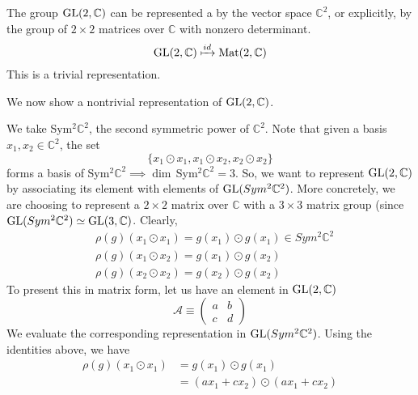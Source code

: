   \begin{example}
    The group $\operatorname{GL}(2, \mathbb{C})$ can be represented a by the vector space $\mathbb{C}^2$, or explicitly, by the group of $2 \times 2$ matrices over $\mathbb{C}$ with nonzero determinant.
    \begin{equation}
      \operatorname{GL}(2, \mathbb{C}) \xmapsto{id} \text{Mat}(2, \mathbb{C})
    \end{equation}
    This is a trivial representation. 
  \end{example}

  We now show a nontrivial representation of $\operatorname{GL}(2, \mathbb{C})$. 

  \begin{example}
    We take Sym$^2 \mathbb{C}^2$, the second symmetric power of $\mathbb{C}^2$. Note that given a basis $x_1, x_2 \in \mathbb{C}^2$, the set
    \begin{equation}
      \{x_1 \odot x_1, x_1 \odot x_2, x_2 \odot x_2\}
    \end{equation}
    forms a basis of Sym$^2 \mathbb{C}^2 \implies \dim\,$Sym$^2 \mathbb{C}^2 = 3$. So, we want to represent $\operatorname{GL}(2, \mathbb{C})$ by associating its element with elements of $\operatorname{GL}(Sym^2 \mathbb{C}^2)$. More concretely, we are choosing to represent a $2 \times 2$ matrix over $\mathbb{C}$ with a $3 \times 3$ matrix group (since $\operatorname{GL}(Sym^2 \mathbb{C}^2) \simeq \operatorname{GL}(3, \mathbb{C})$. Clearly,
    \begin{align*}
      & \rho(g) (x_1 \odot x_1) = g(x_1) \odot g(x_1) \in Sym^2 \mathbb{C}^2 \\
      & \rho(g) (x_1 \odot x_2) = g(x_1) \odot g(x_2) \\
      & \rho(g) (x_2 \odot x_2) = g(x_2) \odot g(x_2)
    \end{align*}
    To present this in matrix form, let us have an element in $\operatorname{GL} (2, \mathbb{C})$
    \begin{equation}
      \mathcal{A} \equiv \begin{pmatrix}
      a & b \\
      c & d
      \end{pmatrix}
    \end{equation}
    We evaluate the corresponding representation in $\operatorname{GL}( Sym^2 \mathbb{C}^2)$. Using the identities above, we have 
    \begin{align*}
      \rho(g) (x_1 \odot x_1) & = g(x_1) \odot g(x_1) \\
      & = (a x_1 + c x_2) \odot (a x_1 + c x_2) \\

\end{align*}
\end{example}

